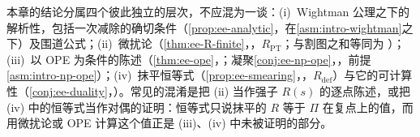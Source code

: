 \begin{remark}[四个逻辑层次]\label{rem:ee-status-layout}
本章的结论分属四个彼此独立的层次，不应混为一谈：(i)~Wightman 公理之下的解析性，包括一次减除的确切条件（\cref{prop:ee-analytic}，在\cref{asm:intro-wightman}之下）及围道公式；(ii)~微扰论（\cref{thm:ee-R-finite}，\tagR，$R_{\mathrm{PT}}$；与割图之和等同为 \tagA）；(iii)~以 OPE 为条件的陈述（\cref{thm:ee-ope}，\tagA；凝聚\cref{conj:ee-np-ope}，\tagC，前提\cref{asm:intro-np-ope}）；(iv)~抹平恒等式（\cref{prop:ee-smearing}，\tagR，$R_{\mathrm{def}}$）与它的可计算性（\cref{conj:ee-duality}，\tagC）。常见的混淆是把 (ii) 当作强子 $R(s)$ 的逐点陈述，或把 (iv) 中的恒等式当作对偶的证明：恒等式只说抹平的 $R$ 等于 $\Pi$ 在复点上的值，而用微扰论或 OPE 计算这个值正是 (iii)、(iv) 中未被证明的部分。
\end{remark}

